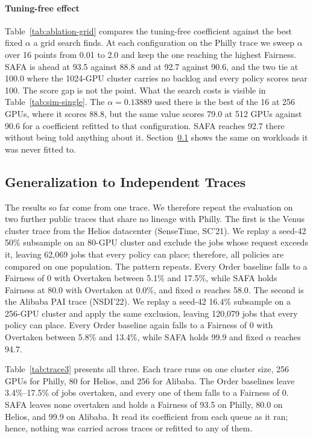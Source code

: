 \documentclass{ieeetj}
\begin{document}
\paragraph{Tuning-free effect}
Table~\ref{tab:ablation-grid} compares the tuning-free coefficient against the best fixed $\alpha$ a grid search finds. At each configuration on the Philly trace we sweep $\alpha$ over 16 points from 0.01 to 2.0 and keep the one reaching the highest Fairness. SAFA is ahead at 93.5 against 88.8 and at 92.7 against 90.6, and the two tie at 100.0 where the 1024-GPU cluster carries no backlog and every policy scores near 100. The score gap is not the point. What the search costs is visible in Table~\ref{tab:sim-single}. The $\alpha=0.13889$ used there is the best of the 16 at 256 GPUs, where it scores 88.8, but the same value scores 79.0 at 512 GPUs against 90.6 for a coefficient refitted to that configuration. SAFA reaches 92.7 there without being told anything about it. Section~\ref{eval:robust:trace} shows the same on workloads it was never fitted to.

\subsection{Generalization to Independent Traces}\label{eval:robust:trace}
The results so far come from one trace. We therefore repeat the evaluation on two further public traces that share no lineage with Philly. The first is the Venus cluster trace from the Helios\cite{hu2021helios} datacenter (SenseTime, SC'21). We replay a seed-42 50\% subsample on an 80-GPU cluster and exclude the jobs whose request exceeds it, leaving 62{,}069 jobs that every policy can place; therefore, all policies are compared on one population. The pattern repeats. Every Order baseline falls to a Fairness of 0 with Overtaken between 5.1\% and 17.5\%, while SAFA holds Fairness at 80.0 with Overtaken at 0.0\%, and fixed $\alpha$ reaches 58.0. The second is the Alibaba PAI\cite{weng2022mlaas} trace (NSDI'22). We replay a seed-42 16.4\% subsample on a 256-GPU cluster and apply the same exclusion, leaving 120{,}079 jobs that every policy can place. Every Order baseline again falls to a Fairness of 0 with Overtaken between 5.8\% and 13.4\%, while SAFA holds 99.9 and fixed $\alpha$ reaches 94.7.

Table~\ref{tab:trace3} presents all three. Each trace runs on one cluster size, 256 GPUs for Philly, 80 for Helios, and 256 for Alibaba. The Order baselines leave 3.4\%--17.5\% of jobs overtaken, and every one of them falls to a Fairness of 0. SAFA leaves none overtaken and holds a Fairness of 93.5 on Philly, 80.0 on Helios, and 99.9 on Alibaba. It read its coefficient from each queue as it ran; hence, nothing was carried across traces or refitted to any of them.
\end{document}
